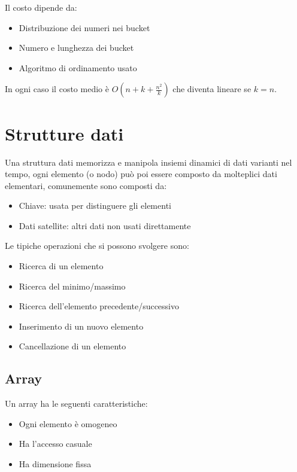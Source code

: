 \documentclass{article}
\begin{document}
\vspace{-5pt}

\noindent Il costo dipende da:
\begin{itemize}
    \item Distribuzione dei numeri nei bucket
    \item Numero e lunghezza dei bucket
    \item Algoritmo di ordinamento usato\newline
\end{itemize}

\vspace{-5pt}

\noindent In ogni caso il costo medio è $O(n+k+\frac{n^2}{k})$ che diventa lineare se $k=n$.

\section{Strutture dati}

Una struttura dati memorizza e manipola insiemi dinamici di dati varianti nel tempo, ogni elemento (o nodo) può poi essere composto da molteplici dati elementari, comunemente sono composti da:
\begin{itemize}
    \item Chiave: usata per distinguere gli elementi
    \item Dati satellite: altri dati non usati direttamente\newline
\end{itemize}

\noindent Le tipiche operazioni che si possono svolgere sono:
\begin{itemize}
    \item Ricerca di un elemento
    \item Ricerca del minimo/massimo
    \item Ricerca dell'elemento precedente/successivo
    \item Inserimento di un nuovo elemento
    \item Cancellazione di un elemento
\end{itemize}

\subsection{Array}

Un array ha le seguenti caratteristiche:
\begin{itemize}
    \item Ogni elemento è omogeneo
    \item Ha l'accesso casuale
    \item Ha dimensione fissa
\end{itemize}
\end{document}
